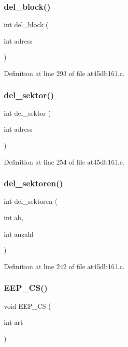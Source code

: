 \subsubsection{del\+\_\+block()}
{\footnotesize\ttfamily int del\+\_\+block (\begin{DoxyParamCaption}\item[{int}]{adress }\end{DoxyParamCaption})}



Definition at line 293 of file at45db161.\+c.

\mbox{\label{at45db161_8c_a7ad55293dd285a6c65358f5f4125f46c}} 
\subsubsection{del\+\_\+sektor()}
{\footnotesize\ttfamily int del\+\_\+sektor (\begin{DoxyParamCaption}\item[{int}]{adress }\end{DoxyParamCaption})}



Definition at line 254 of file at45db161.\+c.

\mbox{\label{at45db161_8c_a8508bb974df22f655c2aa4222ebf9c44}} 
\subsubsection{del\+\_\+sektoren()}
{\footnotesize\ttfamily int del\+\_\+sektoren (\begin{DoxyParamCaption}\item[{int}]{ab,  }\item[{int}]{anzahl }\end{DoxyParamCaption})}



Definition at line 242 of file at45db161.\+c.

\mbox{\label{at45db161_8c_a2a2e2047b56bb55adf72c443f6c77c2d}} 
\subsubsection{E\+E\+P\+\_\+\+C\+S()}
{\footnotesize\ttfamily void E\+E\+P\+\_\+\+CS (\begin{DoxyParamCaption}\item[{int}]{art }\end{DoxyParamCaption})}



